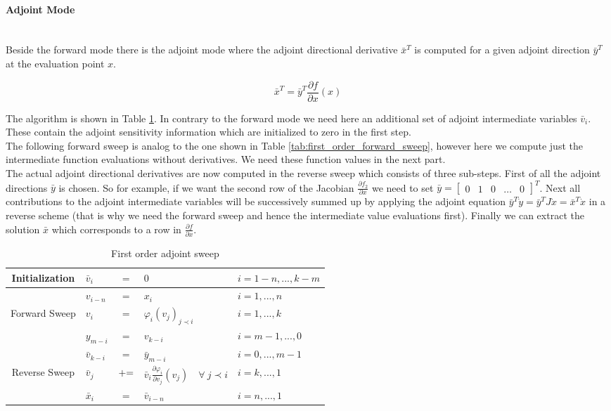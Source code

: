 \documentclass{scrartcl}[12pt, halfparskip]
\begin{document}
\paragraph{Adjoint Mode}\mbox{}\\
Beside the forward mode there is the adjoint mode where the adjoint directional derivative $\bar{x}^T$ is computed for a given adjoint direction $\bar{y}^T$ at the evaluation point $x$. 

\begin{equation}
\bar{x}^T = \bar{y}^T \frac{\partial f}{\partial x}(x)
\end{equation}

The algorithm is shown in Table \ref{tab:first_order_adjoint_sweep}. In contrary to the forward mode we need here an additional set of adjoint intermediate variables $\bar{v}_i$. These contain the adjoint sensitivity information which are initialized to zero in the first step. \\
The following forward sweep is analog to the one shown in Table \ref{tab:first_order_forward_sweep}, however here we compute just the intermediate function evaluations without derivatives. We need these function values in the next part. \\
The actual adjoint directional derivatives are now computed in the reverse sweep which consists of three sub-steps. First of all the adjoint directions $\bar{y}$ is chosen. So for example, if we want the second row of the Jacobian $\frac{\partial f_2}{\partial x}$ we need to set $\bar{y} = \begin{bmatrix}
0 & 1 & 0 & \dots & 0
\end{bmatrix}^T$.
Next all contributions to the adjoint intermediate variables will be successively summed up by applying the adjoint equation $\bar{y}^T \dot{y} = \bar{y}^T J \dot{x} = \bar{x}^T \dot{x}$ in a reverse scheme (that is why we need the forward sweep and hence the intermediate value evaluations first). Finally we can extract the solution $\bar{x}$ which corresponds to a row in $\frac{\partial f}{\partial x}$.


\begin{table}[H]
	\centering
	\begin{tabular}{| c | l c l | l |} \hline
		Initialization & $\bar{v}_i$ & $=$ & $0$ & $i=1-n,...,k-m$ \\ \hline
		& $v_{i-n}$ & $=$ & $x_i$ & $i=1,...,n$ \\
		Forward Sweep & $v_{i}$ & $=$ & $\varphi_i(v_j)_{j \prec i}$ & $i=1,...,k$ \\
		& $y_{m-i}$ & $=$ & $v_{k-i}$ & $i=m-1,...,0$ \\ \hline
		& $\bar{v}_{k-i}$ & $=$ & $\bar{y}_{m-i}$ & $i=0,...,m-1$ \\
		Reverse Sweep & $\bar{v}_j$ & $+ \hspace{-0.1cm} =$ & $\bar{v}_i \frac{\partial \varphi_i}{\partial v_j}(v_j) \quad \forall \ j \prec i$ & $i=k,...,1$ \\
		& $\bar{x}_i$ & $=$ & $\bar{v}_{i-n}$ & $i=n,...,1$ \\ \hline
	\end{tabular}
	\caption{First order adjoint sweep}
	\label{tab:first_order_adjoint_sweep}
\end{table}
\end{document}
